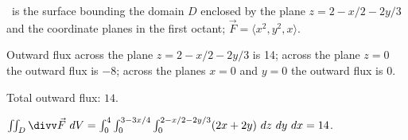 {\surfaceS\ is the surface bounding the domain $D$ enclosed by the plane $z=2-x/2-2y/3$ and the coordinate planes in the first octant; $\vec F = \langle x^2,y^2,x\rangle$.

{\hfill{}\hfill}
}
{Outward flux across the plane $z=2-x/2-2y/3$ is 14; across the plane $z=0$ the outward flux is $-8$; across the planes $x=0$ and $y=0$ the outward flux is 0.

Total outward flux: $14$.

$\iint_D\divv\vec F\ dV = \int_0^{4}\int_0^{3-3x/4}\int_0^{2-x/2-2y/3}(2x+2y)\ dz\ dy\ dx = 14$.
}
